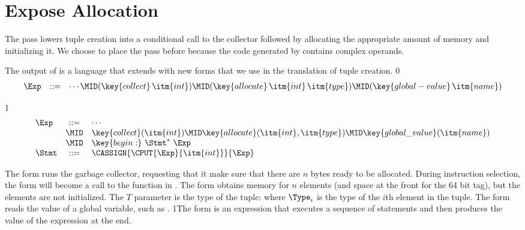 \documentclass[7x10,nocrop]{TimesAPriori_MIT}%
\def\racketEd{0}
\def\pythonEd{1}
\def\edition{1}
\newcommand{\racket}[1]{{\if\edition\racketEd{#1}\fi}}
\newcommand{\python}[1]{{\if\edition\pythonEd #1\fi}}
\begin{document}
\section{Expose Allocation}
\label{sec:expose-allocation}

The pass  lowers tuple creation into a
conditional call to the collector followed by allocating the
appropriate amount of memory and initializing it.  We choose to place
the  pass before
 because the code generated by
 contains complex operands.

The output of  is a language \LangAlloc{}
that extends \LangVec{} with new forms that we use in the translation
of tuple creation.
%
{\if\edition\racketEd
\[
\begin{array}{lcl}
  \Exp &::=& \cdots
      \MID (\key{collect} \,\itm{int})
      \MID (\key{allocate} \,\itm{int}\,\itm{type})
      \MID (\key{global-value} \,\itm{name}) 
\end{array}
\]
\fi}
{\if\edition\pythonEd
\[
\begin{array}{lcl}
  \Exp &::=& \cdots\\
      &\MID& \key{collect}(\itm{int})
      \MID \key{allocate}(\itm{int},\itm{type})
      \MID \key{global\_value}(\itm{name}) \\
      &\MID& \key{begin:} ~ \Stmt^{*} ~ \Exp \\
   \Stmt &::= & \CASSIGN{\CPUT{\Exp}{\itm{int}}}{\Exp}
\end{array}
\]

\fi}

The  form runs the garbage collector, requesting that it
make sure that there are $n$ bytes ready to be allocated. During
instruction selection, the  form will become a call to
the  function in .
%
The  form obtains memory for $n$ elements (and
space at the front for the 64 bit tag), but the elements are not
initialized.   The $T$ parameter is the type
of the tuple:
%
\VECTY{\racket{$\Type_1 \ldots \Type_n$}\python{$\Type_1, \ldots, \Type_n$}}
%
where $\Type_i$ is the type of the $i$th element in the tuple. The
 form reads the value of a global variable, such
as .
%
\python{The  form is an expression that executes a
  sequence of statements and then produces the value of the expression
  at the end.}
\end{document}

